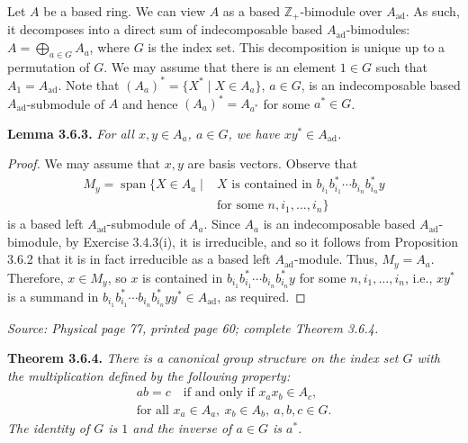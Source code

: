 \documentclass[11pt]{article}
\newcommand{\Zp}{\mathbb{Z}_+}
\newcommand{\Aad}{A_{\mathrm{ad}}}
\newcommand{\sourceloc}[1]{\par\smallskip\noindent\textit{Source: #1.}\par\nopagebreak[4]\smallskip}
\begin{document}
Let $A$ be a based ring. We can view $A$ as a based $\Zp$-bimodule over
$\Aad$. As such, it decomposes into a direct sum of indecomposable
based $\Aad$-bimodules: $A=\bigoplus_{a\in G}A_a$, where $G$ is the
index set. This decomposition is unique up to a permutation of $G$.
We may assume that there is an element $1\in G$ such that $A_1=\Aad$.
Note that $(A_a)^*=\{X^*\mid X\in A_a\}$, $a\in G$, is an
indecomposable based $\Aad$-submodule of $A$ and hence
$(A_a)^*=A_{a^*}$ for some $a^*\in G$.

\noindent\textbf{Lemma 3.6.3.}
\emph{For all $x,y\in A_a$, $a\in G$, we have $xy^*\in\Aad$.}
\begin{proof}
We may assume that $x,y$ are basis vectors. Observe that
\[
\begin{split}
M_y=\operatorname{span}\{X\in A_a\mid{}&X\text{ is contained in }
b_{i_1}b_{i_1}^*\cdots b_{i_n}b_{i_n}^*y\\
&\text{for some }n,i_1,\ldots,i_n\}
\end{split}
\]
is a based left $\Aad$-submodule of $A_a$. Since $A_a$ is an
indecomposable based $\Aad$-bimodule, by Exercise 3.4.3(i), it is
irreducible, and so it follows from Proposition 3.6.2 that it is in
fact irreducible as a based left $\Aad$-module. Thus, $M_y=A_a$.
Therefore, $x\in M_y$, so $x$ is contained in
$b_{i_1}b_{i_1}^*\cdots b_{i_n}b_{i_n}^*y$ for some
$n,i_1,\ldots,i_n$, i.e., $xy^*$ is a summand in
$b_{i_1}b_{i_1}^*\cdots b_{i_n}b_{i_n}^*yy^*\in\Aad$, as required.
\end{proof}

\sourceloc{Physical page 77, printed page 60; complete Theorem 3.6.4}
\noindent\textbf{Theorem 3.6.4.}
\emph{There is a canonical group structure on the index set $G$ with
the multiplication defined by the following property:}
\begin{equation}
\begin{gathered}
ab=c\quad\text{if and only if }x_a x_b\in A_c,\\
\text{for all }x_a\in A_a,\ x_b\in A_b,\ a,b,c\in G.
\end{gathered}
\tag{3.6}\label{eq:3.6}
\end{equation}
\emph{The identity of $G$ is $1$ and the inverse of $a\in G$ is $a^*$.}
\end{document}
